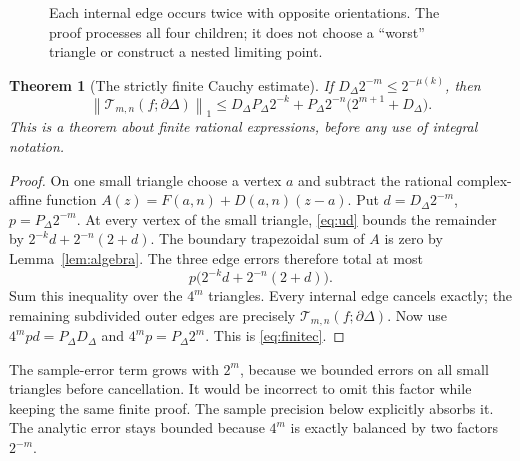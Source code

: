 \documentclass[11pt]{article}
\newtheorem{theorem}{Theorem}[section]
\theoremstyle{definition}
\newcommand{\norm}[1]{\left\lVert#1\right\rVert_1}
\newcommand{\trap}{\mathcal T}
\newcommand{\bd}{\partial}
\begin{document}
\begin{figure}[ht]
\centering
{}
\caption{Each internal edge occurs twice with opposite orientations.
The proof processes all four children; it does not choose a ``worst''
triangle or construct a nested limiting point.}
\end{figure}

\begin{theorem}[The strictly finite Cauchy estimate]\label{thm:finitec}
If \(D_\Delta2^{-m}\le2^{-\mu(k)}\), then
\begin{equation}\label{eq:finitec}
 \boxed{\quad
 \norm{\trap_{m,n}(f;\bd\Delta)}
 \le D_\Delta P_\Delta2^{-k}
   +P_\Delta2^{-n}\bigl(2^{m+1}+D_\Delta\bigr).
 \quad}
\end{equation}
This is a theorem about finite rational expressions, before any use of
integral notation.
\end{theorem}
\begin{proof}
On one small triangle choose a vertex \(a\) and subtract the rational
complex-affine function
\(A(z)=F(a,n)+D(a,n)(z-a)\).
Put \(d=D_\Delta2^{-m}\), \(p=P_\Delta2^{-m}\).
At every vertex of the small triangle, \eqref{eq:ud} bounds the
remainder by
\(2^{-k}d+2^{-n}(2+d)\).
The boundary trapezoidal sum of \(A\) is zero by
Lemma~\ref{lem:algebra}. The three edge errors therefore total at most
\[
 p\bigl(2^{-k}d+2^{-n}(2+d)\bigr).
\]
Sum this inequality over the \(4^m\) triangles. Every internal edge
cancels exactly; the remaining subdivided outer edges are precisely
\(\trap_{m,n}(f;\bd\Delta)\). Now use
\(4^m pd=P_\Delta D_\Delta\) and
\(4^mp=P_\Delta2^m\). This is \eqref{eq:finitec}.
\end{proof}

The sample-error term grows with \(2^m\), because we bounded errors on
all small triangles before cancellation. It would be incorrect to omit
this factor while keeping the same finite proof. The sample precision
below explicitly absorbs it. The analytic error stays bounded because
\(4^m\) is exactly balanced by two factors \(2^{-m}\).
\end{document}
